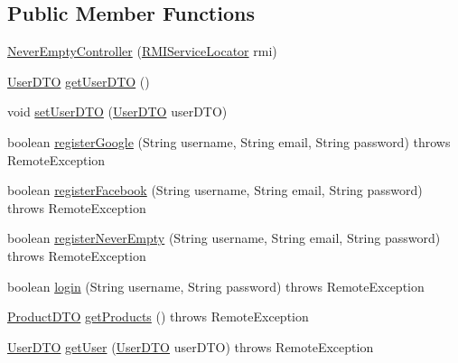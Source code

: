 \subsection*{Public Member Functions}
\begin{DoxyCompactItemize}
\item 
\mbox{\hyperlink{class_s_p_q_1_1controller_1_1_never_empty_controller_ade8f8a56514a9ef3676a93c79b404be5}{Never\+Empty\+Controller}} (\mbox{\hyperlink{class_s_p_q_1_1remote_1_1_r_m_i_service_locator}{R\+M\+I\+Service\+Locator}} rmi)
\item 
\mbox{\hyperlink{class_s_p_q_1_1dto_1_1_user_d_t_o}{User\+D\+TO}} \mbox{\hyperlink{class_s_p_q_1_1controller_1_1_never_empty_controller_ac6b9878caf6a1f22117adf18c5ca56b5}{get\+User\+D\+TO}} ()
\item 
void \mbox{\hyperlink{class_s_p_q_1_1controller_1_1_never_empty_controller_a847c0288b7c18327d81c092f8c234d01}{set\+User\+D\+TO}} (\mbox{\hyperlink{class_s_p_q_1_1dto_1_1_user_d_t_o}{User\+D\+TO}} user\+D\+TO)
\item 
boolean \mbox{\hyperlink{class_s_p_q_1_1controller_1_1_never_empty_controller_a0adc4a1885dcc8ef6fe53bd23ee2316a}{register\+Google}} (String username, String email, String password)  throws Remote\+Exception 
\item 
boolean \mbox{\hyperlink{class_s_p_q_1_1controller_1_1_never_empty_controller_ad766d360d5d5c69d6e6d5b2953b27fac}{register\+Facebook}} (String username, String email, String password)  throws Remote\+Exception 
\item 
boolean \mbox{\hyperlink{class_s_p_q_1_1controller_1_1_never_empty_controller_ad02b010ba25f24bf105fe7b4605e3de1}{register\+Never\+Empty}} (String username, String email, String password)  throws Remote\+Exception 
\item 
boolean \mbox{\hyperlink{class_s_p_q_1_1controller_1_1_never_empty_controller_adb8f5dbbfedb5f3c231de53dccc88899}{login}} (String username, String password)  throws Remote\+Exception 
\item 
\mbox{\hyperlink{class_s_p_q_1_1dto_1_1_product_d_t_o}{Product\+D\+TO}} \mbox{\hyperlink{class_s_p_q_1_1controller_1_1_never_empty_controller_ace99d4d39979b72d620871475a4817f9}{get\+Products}} ()  throws Remote\+Exception
\item 
\mbox{\hyperlink{class_s_p_q_1_1dto_1_1_user_d_t_o}{User\+D\+TO}} \mbox{\hyperlink{class_s_p_q_1_1controller_1_1_never_empty_controller_a4f799c7fc9ce32740ec45401fa6fd1b1}{get\+User}} (\mbox{\hyperlink{class_s_p_q_1_1dto_1_1_user_d_t_o}{User\+D\+TO}} user\+D\+TO)  throws Remote\+Exception 

\end{DoxyCompactItemize}
